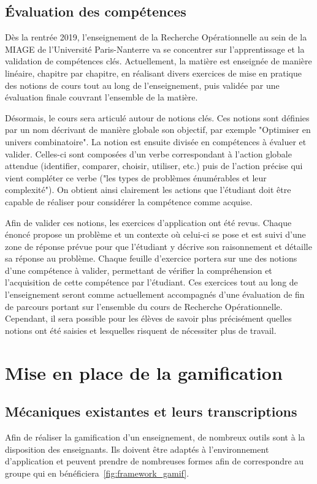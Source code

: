\subsection{Évaluation des compétences}
Dès la rentrée 2019, l'enseignement de la Recherche Opérationnelle au sein de la MIAGE de l'Université Paris-Nanterre va se concentrer sur l'apprentissage et la validation de compétences clés. Actuellement, la matière est enseignée de manière linéaire, chapitre par chapitre, en réalisant divers exercices de mise en pratique des notions de cours tout au long de l'enseignement, puis validée par une évaluation finale couvrant l'ensemble de la matière. \par

Désormais, le cours sera articulé autour de notions clés. Ces notions sont définies par un nom décrivant de manière globale son objectif, par exemple "Optimiser en univers combinatoire". La notion est ensuite divisée en compétences à évaluer et valider. Celles-ci sont composées d'un verbe correspondant à l'action globale attendue (identifier, comparer, choisir, utiliser, etc.) puis de l'action précise qui vient compléter ce verbe ("les types de problèmes énumérables et leur complexité"). On obtient ainsi clairement les actions que l'étudiant doit être capable de réaliser pour considérer la compétence comme acquise. \par 

Afin de valider ces notions, les exercices d'application ont été revus. Chaque énoncé propose un problème et un contexte où celui-ci se pose et est suivi d'une zone de réponse prévue pour que l'étudiant y décrive son raisonnement et détaille sa réponse au problème. Chaque feuille d'exercice portera sur une des notions d'une compétence à valider, permettant de vérifier la compréhension et l'acquisition de cette compétence par l'étudiant. Ces exercices tout au long de l'enseignement seront comme actuellement accompagnés d'une évaluation de fin de parcours portant sur l'ensemble du cours de Recherche Opérationnelle. Cependant, il sera possible pour les élèves de savoir plus précisément quelles notions ont été saisies et lesquelles risquent de nécessiter plus de travail.

\section{Mise en place de la gamification}
\subsection{Mécaniques existantes et leurs transcriptions}
Afin de réaliser la gamification d'un enseignement, de nombreux outils sont à la disposition des enseignants. Ils doivent être adaptés à l'environnement d'application et peuvent prendre de nombreuses formes afin de correspondre au groupe qui en bénéficiera~\ref{fig:framework_gamif}. \par

